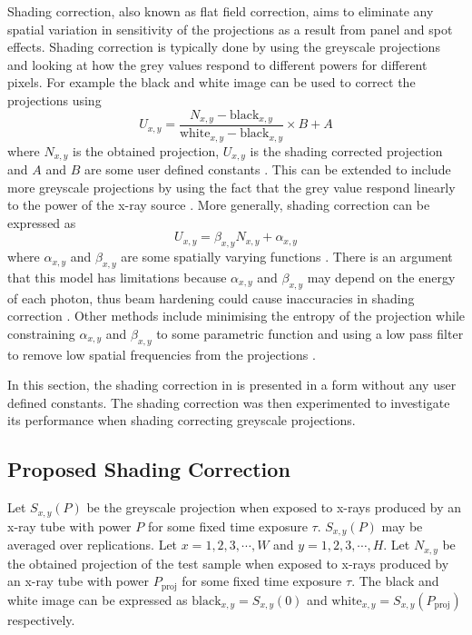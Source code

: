 Shading correction, also known as flat field correction, aims to eliminate any spatial variation in sensitivity of the projections as a result from panel and spot effects. Shading correction is typically done by using the greyscale projections and looking at how the grey values respond to different powers for different pixels. For example the black and white image can be used to correct the projections using
\begin{equation}
U_{x,y} = \dfrac{N_{x,y}-\text{black}_{x,y}}{\text{white}_{x,y}-\text{black}_{x,y}}\times B+A
\label{eq:data_shadingCorrectionOld}
\end{equation}
where $N_{x,y}$ is the obtained projection, $U_{x,y}$ is the shading corrected projection and $A$ and $B$ are some user defined constants \citep{young2000shading, munzenmayer2003enhancing}. This can be extended to include more greyscale projections by using the fact that the grey value respond linearly to the power of the x-ray source \citep{seibert1998flat}. More generally, shading correction can be expressed as
\begin{equation}
U_{x,y} = \beta_{x,y} N_{x,y} + \alpha_{x,y}
\end{equation}
where $\alpha_{x,y}$ and $\beta_{x,y}$ are some spatially varying functions \citep{munzenmayer2003enhancing}. There is an argument that this model has limitations because $\alpha_{x,y}$ and $\beta_{x,y}$ may depend on the energy of each photon, thus beam hardening could cause inaccuracies in shading correction \citep{davidson2003limitations}. Other methods include minimising the entropy of the projection while constraining $\alpha_{x,y}$ and $\beta_{x,y}$ to some parametric function \citep{likar2000retrospective} and using a low pass filter to remove low spatial frequencies from the projections \citep{young2000shading, munzenmayer2003enhancing}.

In this section, the shading correction in \cite{seibert1998flat} is presented in a form without any user defined constants. The shading correction was then experimented to investigate its performance when shading correcting greyscale projections.

\subsection{Proposed Shading Correction}

Let $S_{x,y}(P)$ be the greyscale projection when exposed to x-rays produced by an x-ray tube with power $P$ for some fixed time exposure $\tau$. $S_{x,y}(P)$ may be averaged over replications. Let $x=1,2,3,\cdots, W$ and $y=1,2,3,\cdots,H$. Let $N_{x,y}$ be the obtained projection of the test sample when exposed to x-rays produced by an x-ray tube with power $P_\text{proj}$ for some fixed time exposure $\tau$. The black and white image can be expressed as $\text{black}_{x,y}=S_{x,y}(0)$ and $\text{white}_{x,y}=S_{x,y}(P_\text{proj})$ respectively.

